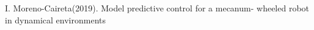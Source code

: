 \documentclass[12pt]{article}
\newcounter{lastnote}
\newenvironment{scilastnote}{%
\setcounter{lastnote}{\value{enumiv}}%
\addtocounter{lastnote}{+1}%
\begin{list}%
{\arabic{lastnote}.}
{\setlength{\leftmargin}{.22in}}
{\setlength{\labelsep}{.5em}}}
{\end{list}}
\begin{document}
%

%













\begin{thebibliography}{99} %
	
	I. Moreno-Caireta(2019).
	\newblock Model predictive control for a mecanum- wheeled robot in dynamical environments
	
\end{thebibliography}
\end{document}
